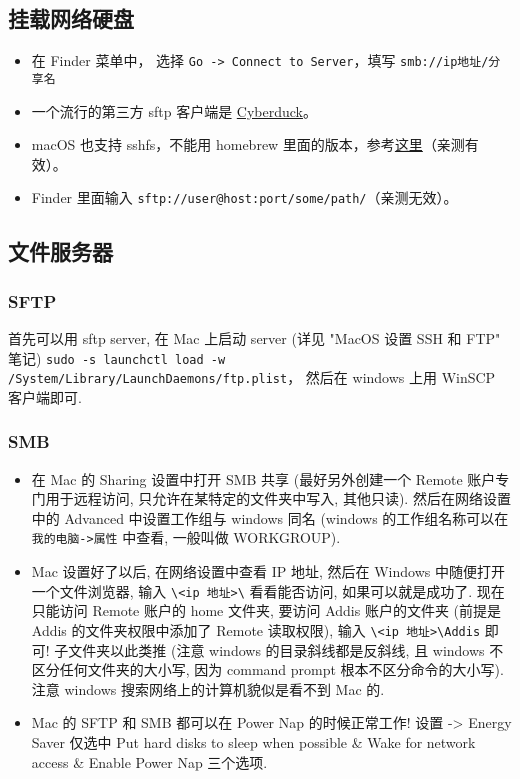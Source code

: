 \subsection{挂载网络硬盘}
\begin{itemize}
\item 在 Finder 菜单中， 选择 \verb`Go -> Connect to Server`，填写 \verb`smb://ip地址/分享名`
\item 一个流行的第三方 sftp 客户端是 \href{https://cyberduck.io/}{Cyberduck}。
\item macOS 也支持 sshfs，不能用 homebrew 里面的版本，参考\href{https://osxfuse.github.io/}{这里}（亲测有效）。
\item Finder 里面输入 \verb`sftp://user@host:port/some/path/`（亲测无效）。
\end{itemize}

\subsection{文件服务器}
\subsubsection{SFTP}
首先可以用 sftp server, 在 Mac 上启动 server (详见 "MacOS 设置 SSH 和 FTP" 笔记)
\verb|sudo -s launchctl load -w /System/Library/LaunchDaemons/ftp.plist|， 然后在 windows 上用 WinSCP 客户端即可.

\subsubsection{SMB}
\begin{itemize}
\item 在 Mac 的 Sharing 设置中打开 SMB 共享 (最好另外创建一个 Remote 账户专门用于远程访问, 只允许在某特定的文件夹中写入, 其他只读). 然后在网络设置中的 Advanced 中设置工作组与 windows 同名 (windows 的工作组名称可以在 \verb|我的电脑->属性| 中查看, 一般叫做 WORKGROUP).

\item Mac 设置好了以后, 在网络设置中查看 IP 地址, 然后在 Windows 中随便打开一个文件浏览器, 输入 \verb|\<ip 地址>\| 看看能否访问, 如果可以就是成功了. 现在只能访问 Remote 账户的 home 文件夹, 要访问 Addis 账户的文件夹 (前提是 Addis 的文件夹权限中添加了 Remote 读取权限), 输入 \verb|\<ip 地址>\Addis| 即可! 子文件夹以此类推 (注意 windows 的目录斜线都是反斜线, 且 windows 不区分任何文件夹的大小写, 因为 command prompt 根本不区分命令的大小写). 注意 windows 搜索网络上的计算机貌似是看不到 Mac 的.

\item Mac 的 SFTP 和 SMB 都可以在 Power Nap 的时候正常工作! 设置 -> Energy Saver 仅选中 Put hard disks to sleep when possible \& Wake for network access \& Enable Power Nap 三个选项.
\end{itemize}

